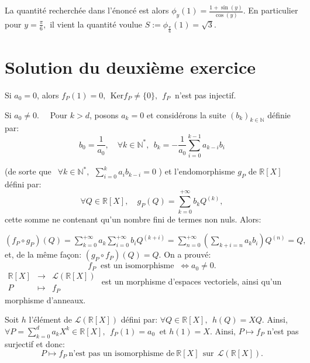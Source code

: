 La quantité recherchée dans l'énoncé est alors $\displaystyle \phi_{y}(1)=\frac{1+\sin(y)}{\cos(y)}.$
En particulier pour $\displaystyle y=\frac{\pi}{6},$ il vient la quantité voulue $\displaystyle S:=\phi_{\frac{\pi}{6}}(1)=\sqrt{3}.$

\section{ Solution du deuxième exercice}%
Si $a_0= 0$, alors $f_P(1) =0,\:\:\text{Ker} f_P \neq \{0\},\:\: f_P\:$ n'est pas injectif.

Si $a_0\neq 0.\quad$ Pour $k>d$, posons $a_k =0$ et considérons la suite $(b_k)_{k\in \mathbb N}$ définie par:   $$b_0 = \dfrac 1 {a_0},\quad \forall  k \in \mathbb N^*,\:\: b_k = - \dfrac 1{a_0}\displaystyle \sum _{i=0}^{k-1}a_{k-i}b_{i} $$ 

(de sorte que $\:\:\forall k \in \mathbb N^*,\:\: \displaystyle \sum_{i=0}^k a_{i} b_{k-i} =0$ ) et l'endomorphisme $g_P$ de $\mathbb R [X]$ défini par: $$  \forall Q \in \mathbb R[X], \quad    g_P(Q) = \displaystyle \sum _{k=0}^{+\infty} b_k Q^{(k)},$$
cette somme ne contenant qu'un nombre fini de termes non nuls. Alors:

$\displaystyle \left(f_P \circ g_P \right) (Q) = \sum _{k=0}^{+\infty} a_k \sum _{i=0}^{+\infty} b_i Q^{(k+i)} = \sum _{n=0}^{+\infty} \left( \sum_{k+i=n} a_kb_i \right) Q^{(n)} = Q,\:$ et, de la même façon: $\left( g_P \circ f_P \right) (Q) =Q.$ On a prouvé: $$ \boxed {f_P \:\text{ est un isomorphisme }\: \iff a_0 \neq 0.}$$ 
$ \begin {array} {ccc} \mathbb R[X]& \longrightarrow & \mathcal L(\mathbb R[X]) \\P &\longmapsto & f_P \end{array}$ est un morphisme d'espaces vectoriels, ainsi qu'un morphisme d'anneaux.


Soit $h$ l'élément de $\mathcal L (\mathbb R[X])$ défini par: $\forall Q \in \mathbb R[X],\:\: h(Q) = XQ.$
Ainsi, $\forall P =\displaystyle \sum  _{k=0}^d a_k X^k \in \mathbb R[X],\:\: f_P(1) =a_0\:$ et $ h(1) = X$. Ainsi, 
$P \longmapsto f_P$ n'est pas surjectif et donc:$$\boxed{ P\longmapsto f_P\: \text{n'est pas un isomorphisme de}\: \mathbb R[X]\: \:\text{sur}\:\: \mathcal L(\mathbb R[X]).}$$ 
 

